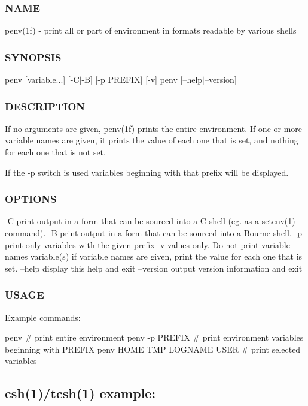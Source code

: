 \subsubsection*{N\+A\+ME}

penv(1f) -\/ print all or part of environment in formats readable by various shells \subsubsection*{S\+Y\+N\+O\+P\+S\+IS}

penv \mbox{[}variable...\mbox{]} \mbox{[}-\/\+C$\vert$-\/B\mbox{]} \mbox{[}-\/p P\+R\+E\+F\+IX\mbox{]} \mbox{[}-\/v\mbox{]} penv \mbox{[}--help$\vert$--version\mbox{]} \subsubsection*{D\+E\+S\+C\+R\+I\+P\+T\+I\+ON}

If no arguments are given, penv(1f) prints the entire environment. If one or more variable names are given, it prints the value of each one that is set, and nothing for each one that is not set.

If the -\/p switch is used variables beginning with that prefix will be displayed. \subsubsection*{O\+P\+T\+I\+O\+NS}

-\/C print output in a form that can be sourced into a C shell (eg. as a setenv(1) command). -\/B print output in a form that can be sourced into a Bourne shell. -\/p print only variables with the given prefix -\/v values only. Do not print variable names variable(s) if variable names are given, print the value for each one that is set. --help display this help and exit --version output version information and exit

\subsubsection*{U\+S\+A\+GE}

Example commands\+:

penv \# print entire environment penv -\/p P\+R\+E\+F\+IX \# print environment variables beginning with P\+R\+E\+F\+IX penv H\+O\+ME T\+MP L\+O\+G\+N\+A\+ME U\+S\+ER \# print selected variables

\subsection*{csh(1)/tcsh(1) example\+:}

